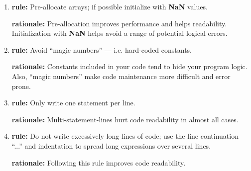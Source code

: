 \documentclass{tufte-book}
\theoremstyle{break}
\begin{document}
\begin{enumerate}
\item \textbf{rule:} Pre-allocate arrays; if possible initialize with \textbf{NaN} values.

\textbf{rationale:} Pre-allocation improves performance and helps readability. Initialization with \textbf{NaN} helps avoid a range of potential logical errors.

\item \textbf{rule:} Avoid ``magic numbers'' --- i.e. hard-coded constants.

\textbf{rationale:} Constants included in your code tend to hide your program logic. Also, ``magic numbers'' make code maintenance more difficult and error prone.

\item \textbf{rule:} Only write one statement per line.

\textbf{rationale:} Multi-statement-lines hurt code readability in almost all cases.

\item \textbf{rule:} Do not write excessively long lines of code; use the line continuation ``...'' and indentation to spread long expressions over several lines.

\textbf{rationale:} Following this rule improves code readability.
\end{enumerate}


\printindex
\end{document}
